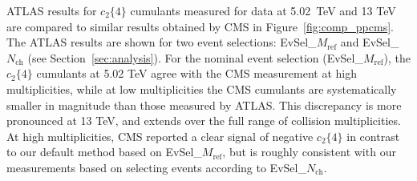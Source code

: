 \documentclass[cernpreprint,texlive=2014,txfonts,UKenglish]{latex/atlasdoc}
\begin{document}
ATLAS results for  $c_2\{4\}$ cumulants measured for \pp data at 5.02~TeV and 13 TeV are compared to similar results obtained by CMS \cite{ppcms3} in Figure~\ref{fig:comp_ppcms}. The ATLAS results are shown for two event selections: EvSel\_$M_{\mathrm{ref}}$ and EvSel\_$N_{\mathrm{ch}}$  (see Section~\ref{sec:analysis}). For the nominal event selection (EvSel\_$M_{\mathrm{ref}}$), the $c_2\{4\}$
cumulants at 5.02 TeV agree with the CMS measurement at high multiplicities, while at low multiplicities
the CMS cumulants are systematically smaller in magnitude than those measured by ATLAS. This discrepancy is more pronounced at 13 TeV, and extends over the full range of collision multiplicities. At
high multiplicities, CMS reported a clear signal of negative $c_2\{4\}$ in  contrast to our default method based on EvSel\_$M_{\mathrm{ref}}$, but is roughly consistent with our measurements based on selecting events according to EvSel\_$N_{\mathrm{ch}}$. 
\end{document}
